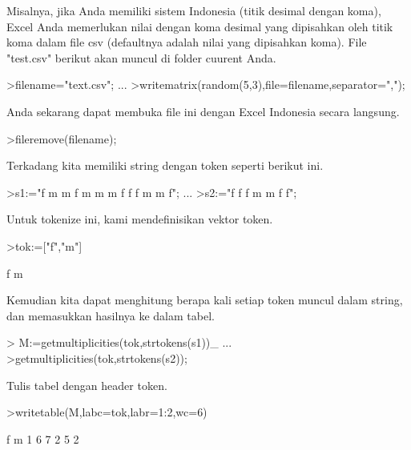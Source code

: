 \documentclass{article}
\begin{document}
\begin{eulernotebook}
\begin{eulercomment}
\begin{eulercomment}
\begin{eulercomment}
Misalnya, jika Anda memiliki sistem Indonesia (titik desimal dengan
koma), Excel Anda memerlukan nilai dengan koma desimal yang dipisahkan
oleh titik koma dalam file csv (defaultnya adalah nilai yang
dipisahkan koma). File "test.csv" berikut akan muncul di folder
cuurent Anda.
\end{eulercomment}
\begin{eulerprompt}
>filename="text.csv"; ...
>writematrix(random(5,3),file=filename,separator=",");
\end{eulerprompt}
\begin{eulercomment}
Anda sekarang dapat membuka file ini dengan Excel Indonesia secara
langsung.
\end{eulercomment}
\begin{eulerprompt}
>fileremove(filename);
\end{eulerprompt}
\begin{eulercomment}
Terkadang kita memiliki string dengan token seperti berikut ini.
\end{eulercomment}
\begin{eulerprompt}
>s1:="f m m f m m m f f f m m f"; ...
>s2:="f f f m m f f";
\end{eulerprompt}
\begin{eulercomment}
Untuk tokenize ini, kami mendefinisikan vektor token.
\end{eulercomment}
\begin{eulerprompt}
>tok:=["f","m"]
\end{eulerprompt}
\begin{euleroutput}
  f
  m
\end{euleroutput}
\begin{eulercomment}
Kemudian kita dapat menghitung berapa kali setiap token muncul dalam
string, dan memasukkan hasilnya ke dalam tabel.
\end{eulercomment}
\begin{eulerprompt}
> M:=getmultiplicities(tok,strtokens(s1))_ ...
>getmultiplicities(tok,strtokens(s2));
\end{eulerprompt}
\begin{eulercomment}
Tulis tabel dengan header token.
\end{eulercomment}
\begin{eulerprompt}
>writetable(M,labc=tok,labr=1:2,wc=6)
\end{eulerprompt}
\begin{euleroutput}
             f     m
       1     6     7
       2     5     2
\end{euleroutput}

\end{eulercomment}
\end{eulercomment}
\end{eulernotebook}
\end{document}
